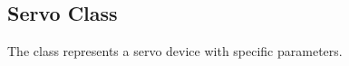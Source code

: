 \documentclass[letterpaper,10pt,english]{sphinxmanual}
\begin{document}
\begin{fulllineitems}
\begin{fulllineitems}

\pysigstartsignatures
{}
\pysigstopsignatures
\end{fulllineitems}



\begin{fulllineitems}

\pysigstartsignatures
{}
\pysigstopsignatures
\end{fulllineitems}



\begin{fulllineitems}

\pysigstartsignatures
{}
\pysigstopsignatures
\end{fulllineitems}



\begin{fulllineitems}

\pysigstartsignatures
{}
\pysigstopsignatures
\end{fulllineitems}


\end{fulllineitems}


\sphinxstepscope


\subsection{Servo Class}
\label{\detokenize{servo:servo-class}}\label{\detokenize{servo::doc}}
\sphinxAtStartPar
The  class represents a servo device with specific parameters.
\end{document}
